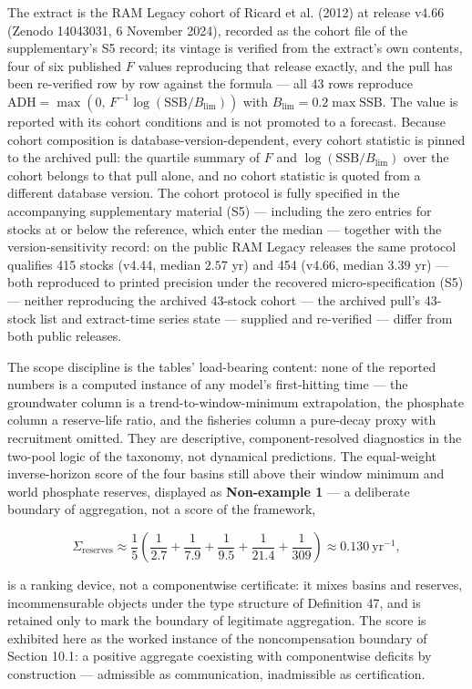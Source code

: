 \documentclass[11pt]{article}
\begin{document}
The extract is the RAM Legacy cohort of Ricard et al. (2012) at release v4.66 (Zenodo 14043031, 6 November 2024), recorded as the cohort file of the supplementary's S5 record; its vintage is verified from the extract's own contents, four of six published \(F\) values reproducing that release exactly, and the pull has been re-verified row by row against the formula --- all 43 rows reproduce \(\mathrm{ADH} =\allowbreak{} \max(0,\allowbreak{}\,\allowbreak{} F^{-1}\log(\mathrm{SSB}/B_{\lim}))\) with \(B_{\lim} =\allowbreak{} 0.2 \max \mathrm{SSB}\). The value is reported with its cohort conditions and is not promoted to a forecast. Because cohort composition is database-version-dependent, every cohort statistic is pinned to the archived pull: the quartile summary of \(F\) and \(\log(\mathrm{SSB}/B_{\lim})\) over the cohort belongs to that pull alone, and no cohort statistic is quoted from a different database version. The cohort protocol is fully specified in the accompanying supplementary material (S5) --- including the zero entries for stocks at or below the reference, which enter the median --- together with the version-sensitivity record: on the public RAM Legacy releases the same protocol qualifies 415 stocks (v4.44, median \(2.57\) yr) and 454 (v4.66, median \(3.39\) yr) --- both reproduced to printed precision under the recovered micro-specification (S5) --- neither reproducing the archived 43-stock cohort --- the archived pull's 43-stock list and extract-time series state --- supplied and re-verified --- differ from both public releases.

The scope discipline is the tables' load-bearing content: none of the reported numbers is a computed instance of any model's first-hitting time --- the groundwater column is a trend-to-window-minimum extrapolation, the phosphate column a reserve-life ratio, and the fisheries column a pure-decay proxy with recruitment omitted. They are descriptive, component-resolved diagnostics in the two-pool logic of the taxonomy, not dynamical predictions. The equal-weight inverse-horizon score of the four basins still above their window minimum and world phosphate reserves, displayed as \textbf{Non-example 1} --- a deliberate boundary of aggregation, not a score of the framework, 

$$\Sigma_{\mathrm{reserves}} \approx \frac{1}{5}\left( \frac{1}{2.7} + \frac{1}{7.9} + \frac{1}{9.5} + \frac{1}{21.4} + \frac{1}{309} \right) \approx 0.130\ \mathrm{yr}^{-1},$$

 is a ranking device, not a componentwise certificate: it mixes basins and reserves, incommensurable objects under the type structure of Definition 47, and is retained only to mark the boundary of legitimate aggregation. The score is exhibited here as the worked instance of the noncompensation boundary of Section 10.1: a positive aggregate coexisting with componentwise deficits by construction --- admissible as communication, inadmissible as certification.
\end{document}
